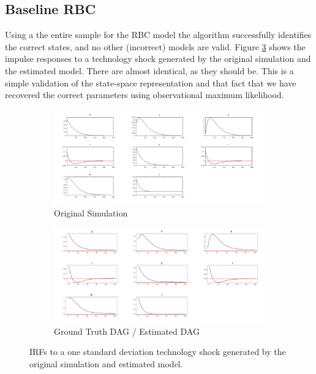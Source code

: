 \documentclass{article}
\begin{document}
\subsection{Baseline RBC}

Using a the entire sample for the RBC model the algorithm successfully identifies the correct states, and no other (incorrect) models are valid. Figure \ref{rbc_irfs} shows the impulse responses to a technology shock generated by the original simulation and the estimated model. There are almost identical, as they should be. This is a simple validation of the state-space representation and that fact that we have recovered the correct parameters using observational maximum likelihood.

\begin{figure}
  \centering
  \begin{subfigure}{0.8\textwidth}
    \centering
    \includegraphics[width=\linewidth]{images/rbc_sim_irf.png} 
    \caption{Original Simulation}
    \label{rbc_simirf}
  \end{subfigure}
  \begin{subfigure}{0.8\textwidth}
    \centering  
    \includegraphics[width=\linewidth]{images/rbc_true_dag_irfs.png}
    \caption{Ground Truth DAG / Estimated DAG}
    \label{rbc_gtirf}
  \end{subfigure}

  \caption{IRFs to a one standard deviation technology shock generated by the original simulation and estimated model.}
  \label{rbc_irfs}
\end{figure} 
\end{document}
